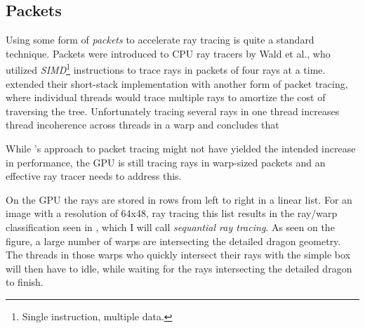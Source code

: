 \subsection{Packets}


Using some form of \textit{packets} to accelerate ray tracing is quite a
standard technique. Packets were introduced to CPU ray tracers by Wald et
al., who utilized \textit{SIMD}\footnote{Single
  instruction, multiple data.} instructions to trace rays in packets of four
rays at a time. \horn{} extended their short-stack implementation with another
form of packet tracing, where individual threads would trace multiple rays to
amortize the cost of traversing the tree. Unfortunately tracing several rays in
one thread increases thread incoherence across threads in a warp and \aila{}
concludes that




While \horn's approach to packet tracing might not have yielded the intended
increase in performance, the GPU is still tracing rays in warp-sized packets and
an effective ray tracer needs to address this.

On the GPU the rays are stored in rows from left to right in a linear list. For
an image with a resolution of 64x48, ray tracing this list results in the
ray/warp classification seen in , which I will
call \textit{sequantial ray tracing}. As seen on the figure, a large number of
warps are intersecting the detailed dragon geometry. The threads in those warps
who quickly intersect their rays with the simple box will then have to idle,
while waiting for the rays intersecting the detailed dragon to finish.

